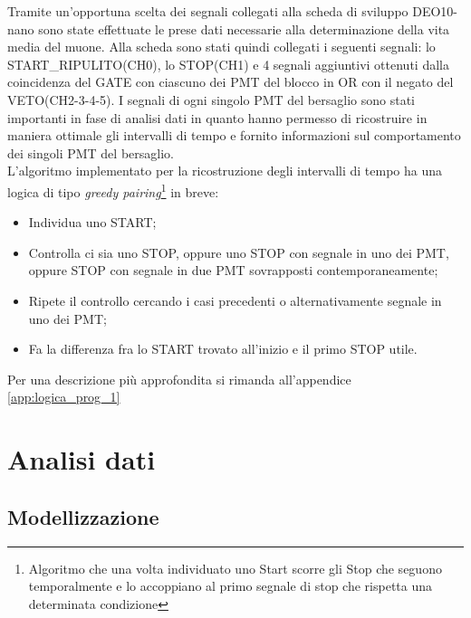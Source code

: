 \documentclass[10pt,a4paper]{article}
\begin{document}
Tramite un'opportuna scelta dei segnali collegati alla scheda di sviluppo DEO10-nano sono state effettuate le prese dati necessarie alla determinazione della vita media del muone. Alla scheda sono stati quindi collegati i seguenti segnali: lo START\_RIPULITO(CH0), lo STOP(CH1) e 4 segnali aggiuntivi ottenuti dalla coincidenza del GATE con ciascuno dei PMT del blocco in OR con il negato del VETO(CH2-3-4-5).
I segnali di ogni singolo PMT del bersaglio sono stati importanti in fase di analisi dati in quanto hanno permesso di ricostruire in maniera ottimale gli intervalli di tempo e fornito informazioni sul comportamento dei singoli PMT del bersaglio.\\
L'algoritmo implementato per la ricostruzione degli intervalli di tempo ha una logica di tipo \textit{greedy pairing}\footnote{Algoritmo che una volta individuato uno Start scorre gli Stop che seguono temporalmente e lo accoppiano al primo segnale di stop che rispetta una determinata condizione} in breve:
\begin{itemize}
\item Individua uno START;
\item Controlla ci sia uno STOP, oppure uno STOP con segnale in uno dei PMT, oppure STOP con segnale in due PMT sovrapposti contemporaneamente;
\item Ripete il controllo cercando i casi precedenti o alternativamente segnale in uno dei PMT;
\item Fa la differenza fra lo START trovato all'inizio e il primo STOP utile.
\end{itemize}
Per una descrizione più approfondita si rimanda all'appendice \ref{app:logica_prog_1}
\section{Analisi dati}\label{sec:analisi_dati}

\subsection{Modellizzazione}\label{subsec:modelliz}
\end{document}
